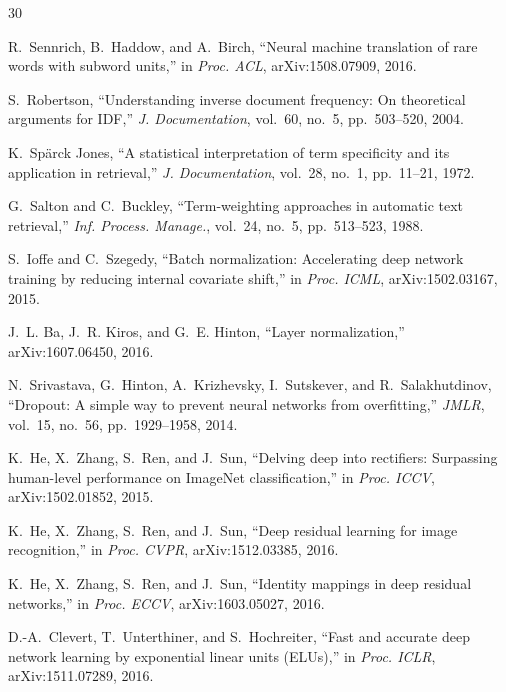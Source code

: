 \documentclass[10pt,conference,letterpaper]{IEEEtran}
\begin{document}

\begin{thebibliography}{30}

R.~Sennrich, B.~Haddow, and A.~Birch, ``Neural machine translation of rare
words with subword units,'' in \emph{Proc. ACL}, arXiv:1508.07909, 2016.

S.~Robertson, ``Understanding inverse document frequency: On theoretical
arguments for IDF,'' \emph{J. Documentation}, vol.~60, no.~5, pp.~503--520,
2004.

K.~Sp\"{a}rck Jones, ``A statistical interpretation of term specificity and its
application in retrieval,'' \emph{J. Documentation}, vol.~28, no.~1,
pp.~11--21, 1972.

G.~Salton and C.~Buckley, ``Term-weighting approaches in automatic text
retrieval,'' \emph{Inf. Process. Manage.}, vol.~24, no.~5, pp.~513--523, 1988.

S.~Ioffe and C.~Szegedy, ``Batch normalization: Accelerating deep network
training by reducing internal covariate shift,'' in \emph{Proc. ICML},
arXiv:1502.03167, 2015.

J.~L. Ba, J.~R. Kiros, and G.~E. Hinton, ``Layer normalization,''
arXiv:1607.06450, 2016.

N.~Srivastava, G.~Hinton, A.~Krizhevsky, I.~Sutskever, and R.~Salakhutdinov,
``Dropout: A simple way to prevent neural networks from overfitting,''
\emph{JMLR}, vol.~15, no.~56, pp.~1929--1958, 2014.

K.~He, X.~Zhang, S.~Ren, and J.~Sun, ``Delving deep into rectifiers:
Surpassing human-level performance on ImageNet classification,'' in
\emph{Proc. ICCV}, arXiv:1502.01852, 2015.

K.~He, X.~Zhang, S.~Ren, and J.~Sun, ``Deep residual learning for image
recognition,'' in \emph{Proc. CVPR}, arXiv:1512.03385, 2016.

K.~He, X.~Zhang, S.~Ren, and J.~Sun, ``Identity mappings in deep residual
networks,'' in \emph{Proc. ECCV}, arXiv:1603.05027, 2016.

D.-A.~Clevert, T.~Unterthiner, and S.~Hochreiter, ``Fast and accurate deep
network learning by exponential linear units (ELUs),'' in \emph{Proc. ICLR},
arXiv:1511.07289, 2016.


\end{thebibliography}
\end{document}
